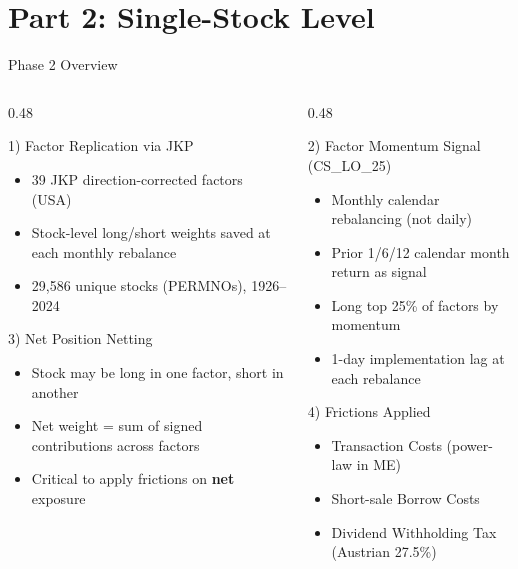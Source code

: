 \documentclass[
  ignorenonframetext,
  aspectratio=169]{beamer}
\begin{document}
\section{Part 2: Single-Stock Level}\label{part-2-single-stock-level}

\begin{frame}{Phase 2 Overview}
\label{phase-2-overview}
\begin{columns}[T]
\begin{column}{0.48\textwidth}
\begin{alertblock}{1) Factor Replication via JKP}
\begin{itemize}
\item 39 JKP direction-corrected factors (USA)
\item Stock-level long/short weights saved at each monthly rebalance
\item 29,586 unique stocks (PERMNOs), 1926--2024
\end{itemize}
\end{alertblock}
\begin{alertblock}{3) Net Position Netting}
\begin{itemize}
\item Stock may be long in one factor, short in another
\item Net weight = sum of signed contributions across factors
\item Critical to apply frictions on \textbf{net} exposure
\end{itemize}
\end{alertblock}
\end{column}
\begin{column}{0.48\textwidth}
\begin{alertblock}{2) Factor Momentum Signal (CS\_LO\_25)}
\begin{itemize}
\item Monthly calendar rebalancing (not daily)
\item Prior 1/6/12 calendar month return as signal
\item Long top 25\% of factors by momentum
\item 1-day implementation lag at each rebalance
\end{itemize}
\end{alertblock}
\begin{alertblock}{4) Frictions Applied}
\begin{itemize}
\item Transaction Costs (power-law in ME)
\item Short-sale Borrow Costs
\item Dividend Withholding Tax (Austrian 27.5\%)
\end{itemize}
\end{alertblock}
\end{column}
\end{columns}
\end{frame}
\end{document}
